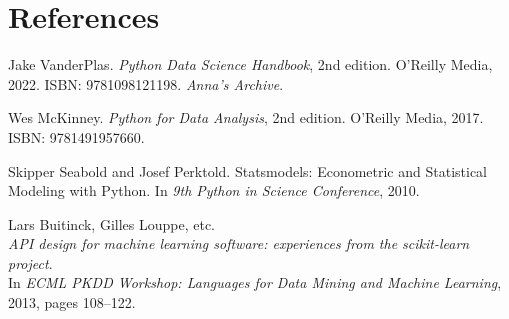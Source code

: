 \documentclass[12pt]{article}
\begin{document}
\section{References}

\begin{thebibliography}{99}

    Jake VanderPlas.
    \textit{Python Data Science Handbook}, 2nd edition.
    O'Reilly Media, 2022. ISBN: 9781098121198. \textit{Anna’s Archive}.
    
    Wes McKinney.
    \textit{Python for Data Analysis}, 2nd edition.
    O'Reilly Media, 2017. ISBN: 9781491957660.
    
    Skipper Seabold and Josef Perktold.
    Statsmodels: Econometric and Statistical Modeling with Python.
    In \textit{9th Python in Science Conference}, 2010.
    
    Lars Buitinck, Gilles Louppe, etc.\\
    \textit{API design for machine learning software: experiences from the scikit-learn project}.\\
    In \textit{ECML PKDD Workshop: Languages for Data Mining and Machine Learning}, 2013, pages 108--122.
    
    \end{thebibliography}


\end{document}
